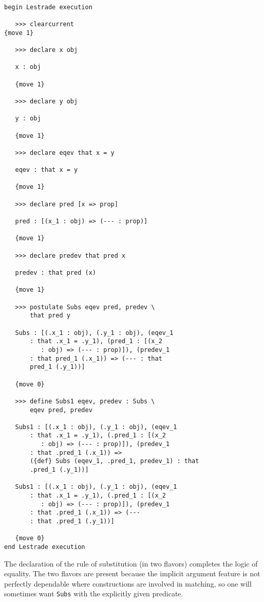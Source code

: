 \documentclass[12pt]{article}
\begin{document}
\begin{verbatim}

begin Lestrade execution

   >>> clearcurrent
{move 1}

   >>> declare x obj

   x : obj

   {move 1}

   >>> declare y obj

   y : obj

   {move 1}

   >>> declare eqev that x = y

   eqev : that x = y

   {move 1}

   >>> declare pred [x => prop]

   pred : [(x_1 : obj) => (--- : prop)]

   {move 1}

   >>> declare predev that pred x

   predev : that pred (x)

   {move 1}

   >>> postulate Subs eqev pred, predev \
       that pred y

   Subs : [(.x_1 : obj), (.y_1 : obj), (eqev_1 
       : that .x_1 = .y_1), (pred_1 : [(x_2 
          : obj) => (--- : prop)]), (predev_1 
       : that pred_1 (.x_1)) => (--- : that 
       pred_1 (.y_1))]

   {move 0}

   >>> define Subs1 eqev, predev : Subs \
       eqev pred, predev

   Subs1 : [(.x_1 : obj), (.y_1 : obj), (eqev_1 
       : that .x_1 = .y_1), (.pred_1 : [(x_2 
          : obj) => (--- : prop)]), (predev_1 
       : that .pred_1 (.x_1)) => 
       ({def} Subs (eqev_1, .pred_1, predev_1) : that 
       .pred_1 (.y_1))]

   Subs1 : [(.x_1 : obj), (.y_1 : obj), (eqev_1 
       : that .x_1 = .y_1), (.pred_1 : [(x_2 
          : obj) => (--- : prop)]), (predev_1 
       : that .pred_1 (.x_1)) => (--- 
       : that .pred_1 (.y_1))]

   {move 0}
end Lestrade execution
\end{verbatim}

The declaration of the rule of substitution (in two flavors) completes the logic of equality.  The two flavors are present because the implicit argument feature is not perfectly dependable where constructions are involved in matching, so one will sometimes want {\tt Subs} with the explicitly given predicate.
\end{document}
